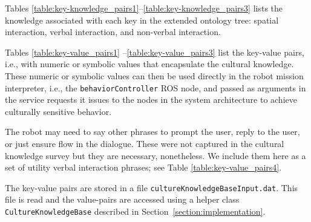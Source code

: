 \documentclass{CSSRforAfrica}
\begin{document}
Tables \ref{table:key-knowledge_pairs1}--\ref{table:key-knowledge_pairs3}  lists the knowledge associated with each key in the extended ontology tree: spatial interaction, verbal interaction, and non-verbal interaction.

Tables \ref{table:key-value_pairs1} --\ref{table:key-value_pairs3} list the key-value pairs, i.e., with numeric or symbolic values that encapsulate the cultural knowledge.  These numeric or symbolic values can then be used directly in the robot mission interpreter, i.e., the {\small \tt behaviorController} ROS node, and passed as arguments in the service requests it issues to the nodes in the system architecture to achieve culturally sensitive behavior.

The robot may need to say other phrases to prompt the user, reply to the user, or just ensure flow in the dialogue. These were not captured in the cultural knowledge survey but they are necessary, nonetheless.  We include them here as  a set of utility verbal interaction phrases; see Table \ref{table:key-value_pairs4}.

The key-value pairs are stored in a file {\tt \small cultureKnowledgeBaseInput.dat}. This file is read and the value-pairs are accessed using a helper class {\tt \small CultureKnowledgeBase} described in Section~\ref{section:implementation}.  
\end{document}
